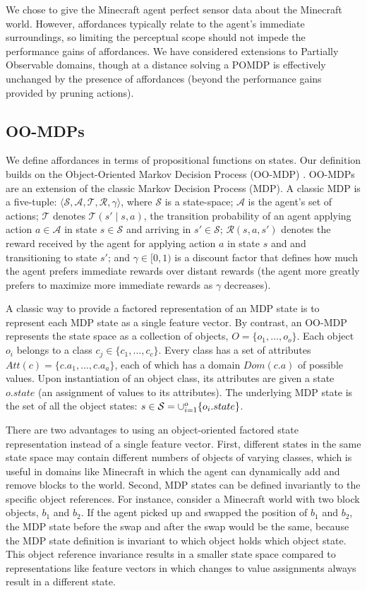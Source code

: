\documentclass[letterpaper]{article}
\begin{document}
We chose to give the Minecraft agent perfect sensor data about the Minecraft world.
However, affordances typically relate to the agent's immediate surroundings,
so limiting the perceptual scope should not impede the performance gains of affordances.
We have considered extensions to Partially Observable domains, though at a distance
solving a POMDP is effectively unchanged by the presence of affordances (beyond the
performance gains provided by pruning actions).

\subsection{OO-MDPs}
We define affordances in terms of propositional functions on states. Our definition builds on the Object-Oriented Markov Decision Process
(OO-MDP) \cite{diuk08}.  OO-MDPs are an extension of
the classic Markov Decision Process (MDP).  A classic MDP is a
five-tuple: $\langle \mathcal{S}, \mathcal{A}, \mathcal{T},
\mathcal{R}, \gamma \rangle$, where $\mathcal{S}$ is a state-space;
$\mathcal{A}$ is the agent's set of actions; $\mathcal{T}$ denotes
$\mathcal{T}(s' \mid s,a)$, the transition probability of an agent
applying action $a \in \mathcal{A}$ in state $s \in \mathcal{S}$ and
arriving in $s' \in \mathcal{S}$; $\mathcal{R}(s,a,s')$ denotes the
reward received by the agent for applying action $a$ in state $s$ and
and transitioning to state $s'$; and $\gamma \in [0, 1)$ is a discount
  factor that defines how much the agent prefers immediate rewards
  over distant rewards (the agent more greatly prefers to maximize
  more immediate rewards as $\gamma$ decreases).

A classic way to provide a factored representation of an MDP state is to represent
each MDP state as a single feature vector. By contrast, an OO-MDP represents the state space as a collection of objects,
$O = \{o_1, \ldots, o_o \}$.  Each object $o_i$ belongs to a
class $c_j \in  \{c_1, \ldots, c_c\}$. Every class has a set of attributes
$Att(c) = \{c.a_1, \ldots, c.a_a \}$, each of which has a domain $Dom(c.a)$ of possible values.
Upon instantiation of an object class, its attributes are given a state $o.state$
(an assignment of values to its attributes).  The underlying MDP state is the set
of all the object states: $s \in {\cal S} = \cup_{i = 1}^o \{o_i.state\}$. 

There are two advantages to using an object-oriented factored state
representation instead of a single feature vector. First, different
states in the same state space may contain different numbers of
objects of varying classes, which is useful in domains like Minecraft
in which the agent can dynamically add and remove blocks to the
world. Second, MDP states can be defined invariantly to the specific
object references.  For instance, consider a Minecraft world with two
block objects, $b_1$ and $b_2$.  If the agent picked up and swapped
the position of $b_1$ and $b_2$, the MDP state before the swap and
after the swap would be the same, because the MDP state definition is
invariant to which object holds which object state. 
This object reference invariance results in a smaller state space compared
to representations like feature vectors in which changes to value
assignments always result in a different state.
\end{document}
